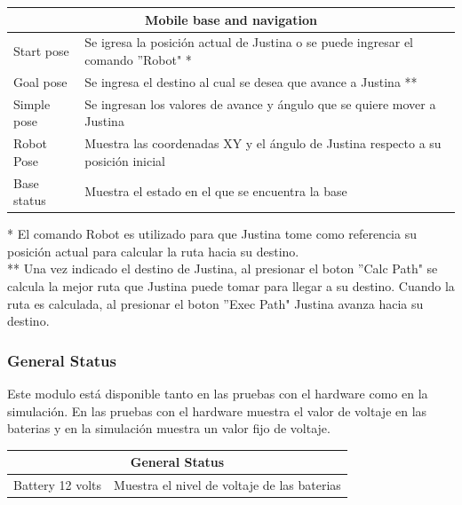 \documentclass[user_manual.tex]{subfiles}
\begin{document}
\begin{table}[H]
\begin{center}
\begin{tabular}{|l|l|}%

\hline
\multicolumn{2}{|c|}{Mobile base and navigation}                                                   \\ \hline
Start pose      & Se igresa la posición actual de Justina o se puede ingresar el comando ''Robot" * \\ \hline
Goal pose       & Se ingresa el destino al cual se desea que avance a Justina **                     \\ \hline
Simple pose     & Se ingresan los valores de avance y ángulo que se quiere mover a Justina            \\ \hline
Robot Pose      & Muestra las coordenadas XY y el ángulo de Justina respecto a su posición inicial     \\ \hline
Base status     & Muestra el estado en el que se encuentra la base                                      \\ \hline
\end{tabular}
\end{center}
\end{table}

* El comando Robot es utilizado para que Justina tome como referencia su posición actual para calcular la ruta hacia su destino.\\

** Una vez indicado el destino de Justina, al presionar el boton ''Calc Path" se calcula la mejor ruta que Justina puede tomar para llegar a su destino. Cuando la ruta es calculada, al presionar el boton ''Exec Path" Justina avanza hacia su destino.



\subsubsection{General Status}

Este modulo está disponible tanto en las pruebas con el hardware como en la simulación. En las pruebas con el hardware muestra el valor de voltaje en las baterias y en la simulación muestra un valor fijo de voltaje.

\begin{table}[H]
\begin{center}
\begin{tabular}{|l|l|}%

\hline
\multicolumn{2}{|c|}{General Status} \\ \hline
Battery 12 volts  & Muestra el nivel de voltaje de las baterias  \\ \hline


\end{tabular}
\end{center}
\end{table}
\end{document}
